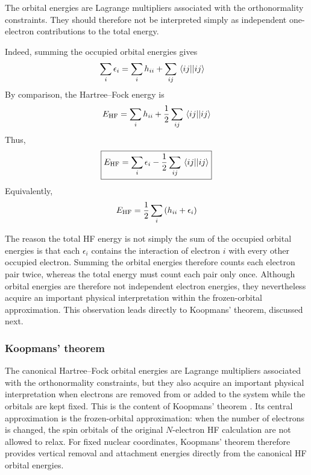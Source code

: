 \documentclass[11pt,a4paper,titlepage]{article}
\numberwithin{equation}{section}
\begin{document}
The orbital energies are Lagrange multipliers associated with the
orthonormality constraints. They should therefore not be interpreted simply
as independent one-electron contributions to the total energy.

Indeed, summing the occupied orbital energies gives
\begin{equation}
\begin{split}
  \sum_i\epsilon_i
  &=
  \sum_i h_{ii}
  +
  \sum_{ij}
  \mel{ij}{}{ij}
\end{split}
\end{equation}
By comparison, the Hartree--Fock energy is
\begin{equation}
  E_\text{HF}
  =
  \sum_i h_{ii}
  +
  \frac{1}{2}
  \sum_{ij}
  \mel{ij}{}{ij}
\end{equation}
Thus,
\begin{equation}
  \boxed{
  E_\text{HF}
  =
  \sum_i\epsilon_i
  -
  \frac{1}{2}
  \sum_{ij}
  \mel{ij}{}{ij}
  }
  \label{eq:hf-energy-orbital-energies}
\end{equation}
Equivalently,
\begin{equation}
  E_\text{HF}
  =
  \frac{1}{2}
  \sum_i
  \qty(
    h_{ii}+\epsilon_i
  )
  \label{eq:hf-energy-half-sum}
\end{equation}

The reason the total HF energy is not simply the sum of the occupied
orbital energies is that each $\epsilon_i$ contains the interaction of
electron $i$ with every other occupied electron. Summing the orbital
energies therefore counts each electron pair twice, whereas the total
energy must count each pair only once.
Although orbital energies are therefore not independent electron energies,
they nevertheless acquire an important physical interpretation within the
frozen-orbital approximation. This observation leads directly to
Koopmans' theorem, discussed next.

\subsubsection{Koopmans' theorem}

The canonical Hartree--Fock orbital energies are Lagrange multipliers
associated with the orthonormality constraints, but they also acquire an
important physical interpretation when electrons are removed from or added
to the system while the orbitals are kept fixed.
This is the content of Koopmans' theorem \citep{Koopmans1934}. Its central approximation is
the frozen-orbital approximation: when the number of electrons is
changed, the spin orbitals of the original $N$-electron HF calculation are
not allowed to relax.
For fixed nuclear coordinates, Koopmans' theorem therefore provides
vertical removal and attachment energies directly from the canonical
HF orbital energies.
\end{document}
